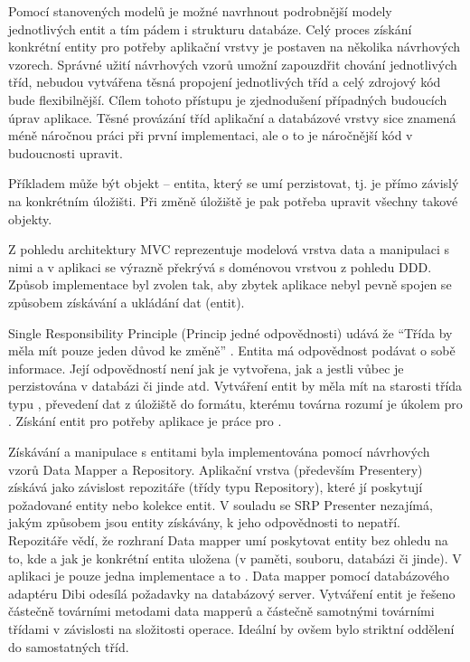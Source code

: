Pomocí stanovených modelů je možné navrhnout podrobnější modely jednotlivých entit a tím pádem i strukturu databáze.
\clearpage
{}
Celý proces získání konkrétní entity pro potřeby aplikační vrstvy je postaven na několika návrhových vzorech. Správné užití návrhových vzorů umožní zapouzdřit chování jednotlivých tříd, nebudou vytvářena těsná propojení jednotlivých tříd a celý zdrojový kód bude flexibilnější. Cílem tohoto přístupu je zjednodušení případných budoucích úprav aplikace. Těsné provázání tříd aplikační a databázové vrstvy sice znamená méně náročnou práci při první implementaci, ale o to je náročnější kód v budoucnosti upravit. 

Příkladem může být objekt -- entita, který se umí perzistovat, tj. je přímo závislý na konkrétním úložišti. Při změně úložiště je pak potřeba upravit všechny takové objekty.

Z pohledu architektury MVC reprezentuje modelová vrstva data a manipulaci s nimi a v aplikaci se výrazně překrývá s doménovou vrstvou z pohledu DDD. Způsob implementace byl zvolen tak, aby zbytek aplikace nebyl pevně spojen se způsobem získávání a ukládání dat (entit).

Single Responsibility Principle (Princip jedné odpovědnosti) udává že ``Třída by měla mít pouze jeden důvod ke změně'' . Entita má odpovědnost podávat o sobě informace. Její odpovědností není jak je vytvořena, jak a jestli vůbec je perzistována v databázi či jinde atd. Vytváření entit by měla mít na starosti třída typu , převedení dat z úložiště do formátu, kterému továrna rozumí je úkolem pro . Získání entit pro potřeby aplikace je práce pro . 

Získávání a manipulace s entitami byla implementována pomocí návrhových vzorů Data Mapper a Repository. Aplikační vrstva (především Presentery) získává jako závislost repozitáře (třídy typu Repository), které jí poskytují požadované entity nebo kolekce entit. V souladu se SRP Presenter nezajímá, jakým způsobem jsou entity získávány, k jeho odpovědnosti to nepatří. Repozitáře vědí, že rozhraní Data mapper umí poskytovat entity bez ohledu na to, kde a jak je konkrétní entita uložena (v paměti, souboru, databázi či jinde). V aplikaci je pouze jedna implementace a to . Data mapper pomocí databázového adaptéru Dibi odesílá požadavky na databázový server. Vytváření entit je řešeno částečně továrními metodami data mapperů a částečně samotnými továrními třídami v závislosti na složitosti operace. Ideální by ovšem bylo striktní oddělení do samostatných tříd.
\clearpage

